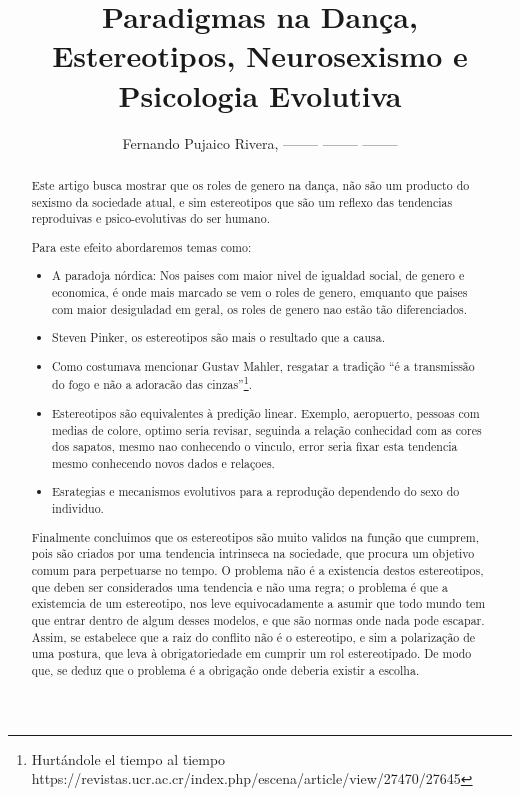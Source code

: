 \documentclass[a4paper,10pt]{article}
\title{Paradigmas na Dança, Estereotipos, Neurosexismo e Psicologia Evolutiva}
\author{Fernando Pujaico Rivera, -------- -------- --------}
\date{}
\begin{document}
\maketitle

\begin{abstract}

Este artigo busca mostrar que os roles de genero na dança,
não são um producto do sexismo da sociedade atual, 
e sim estereotipos que são um reflexo das tendencias 
reproduivas e psico-evolutivas do ser humano.

Para este efeito abordaremos temas como:

\begin{itemize}
\item A paradoja nórdica: Nos paises com maior nivel de igualdad social, 
de genero e economica, é onde mais marcado se vem o roles de genero,
emquanto que paises com maior desiguladad em geral,
os roles de genero nao estão tão diferenciados.

\item Steven Pinker, os estereotipos são mais o resultado que a causa.

\item  Como costumava mencionar Gustav Mahler, resgatar 
a tradição ``é a transmissão do fogo e não 
a adoracão das cinzas''\footnote{Hurtándole el tiempo al tiempo https://revistas.ucr.ac.cr/index.php/escena/article/view/27470/27645}.

\item Estereotipos são equivalentes à predição linear. Exemplo, aeropuerto, 
pessoas com medias de colore, optimo seria revisar, seguinda a relação 
conhecidad com as cores dos sapatos, mesmo nao conhecendo o vinculo,
error seria fixar esta tendencia mesmo conhecendo novos dados e relaçoes.

\item Esrategias e mecanismos evolutivos para a reprodução dependendo do sexo do individuo.

\end{itemize}
Finalmente concluimos que os estereotipos são muito validos na função que cumprem, 
pois são criados por uma tendencia intrinseca na sociedade,
que procura um objetivo comum para perpetuarse no tempo. 
O problema não é a existencia destos estereotipos, 
que deben ser considerados uma tendencia e não uma regra;
o problema é que a existemcia de um estereotipo, 
nos leve equivocadamente a asumir que todo mundo tem que entrar dentro de algum desses modelos,
e que são normas onde nada pode escapar.
Assim, se estabelece que a raiz do conflito não é o estereotipo, 
e sim a polarização de uma postura, 
que leva à obrigatoriedade em cumprir um rol estereotipado.
De modo que, se deduz que o problema é a obrigação onde deberia existir a escolha.

\end{abstract}
\end{document}
